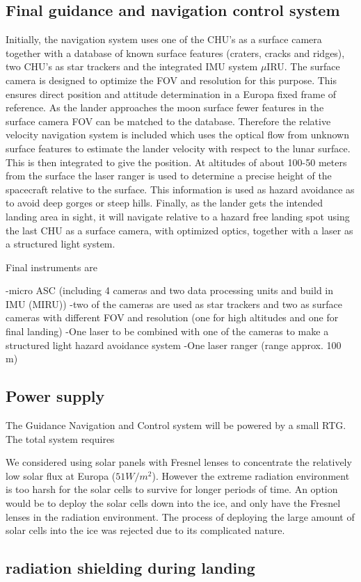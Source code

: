  
\subsection{Final guidance and navigation control system}
Initially, the navigation system uses one of the CHU's as a surface camera together with a database of known surface
features (craters, cracks and ridges), two CHU's as star trackers and the integrated IMU system $\mu$IRU. The surface camera is designed to optimize the FOV and resolution for this purpose. This ensures direct position and attitude determination in a Europa fixed frame of reference.
As the lander approaches the moon surface fewer features in the surface camera FOV
can be matched to the database. Therefore the relative velocity navigation system is included
which uses the optical flow from unknown surface features to estimate
the lander velocity with respect to the lunar surface. This is then integrated to give the
position. At altitudes of about 100-50 meters from the surface the laser ranger is used to determine a precise height of the spacecraft relative to the surface. This information is used as hazard avoidance as to avoid deep gorges or steep hills. Finally, as the lander gets the intended landing area in sight, it will navigate
relative to a hazard free landing spot using the last CHU as a surface camera, with optimized optics, together with a laser as a structured light system. 

Final instruments are 

-micro ASC (including 4 cameras and two data processing units and build in IMU (MIRU))
-two of the cameras are used as star trackers and two as surface cameras with different FOV and resolution (one for high altitudes and one for final landing)
-One laser to be combined with one of the cameras to make a structured light hazard avoidance system
-One laser ranger (range approx. 100 m)


\subsection{Power supply}

The Guidance Navigation and Control system will be powered by a small RTG. The total system requires 

We considered using solar panels with Fresnel lenses to concentrate the relatively low solar flux at Europa ($51 W/m^2$). However the extreme radiation environment is too harsh for the solar cells to survive for longer periods of time. An option would be to deploy the solar cells down into the ice, and only have the Fresnel lenses in the radiation environment. The process of deploying the large amount of solar cells into the ice was rejected due to its complicated nature. 




\subsection{radiation shielding during landing}